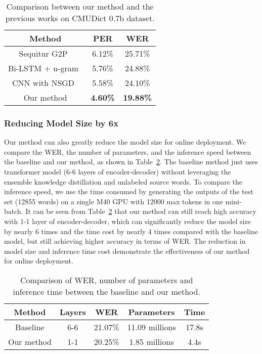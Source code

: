 \documentclass[a4paper]{article}
\begin{document}
\begin{table}[th]
  \caption{Comparison between our method and the previous works on CMUDict 0.7b dataset.}
  \label{tab:result1}
  \centering
  \begin{tabular}{ccc}
   \toprule
    \textbf{Method}                     & \textbf{PER} &\textbf{WER}          \\
    \midrule
     Sequitur G2P~\cite{bisani2008joint}                   &6.12\%&25.71\%           \\
     Bi-LSTM + n-gram~\cite{milde2017multitask}                     &5.76\%&24.88\%           \\
     CNN with NSGD~\cite{chae2018convolutional}                     &5.58\%&24.10\%          \\
\midrule
      Our method &\textbf{4.60\%}&\textbf{19.88\%}            \\
    \bottomrule
  \end{tabular}
  \end{table}
\vspace{-0.4cm}
\subsubsection{Reducing Model Size by 6x}
Our method can also greatly reduce the model size for online deployment. We compare the WER, the number of parameters, and the inference speed between the baseline and our method, as shown in Table~\ref{tab:result3}. The baseline method just uses transformer model (6-6 layers of encoder-decoder) without leveraging the ensemble knowledge distillation and unlabeled source words. To compare the inference speed, we use the time consumed by generating the outputs of the test set (12855 words) on a single M40 GPU with 12000 max tokens in one mini-batch. It can be seen from Table~\ref{tab:result3} that our method can still reach high accuracy with 1-1 layer of encoder-decoder, which can significantly reduce the model size by nearly 6 times and the time cost by nearly 4 times compared with the baseline model, but still achieving higher accuracy in terms of WER. The reduction in model size and inference time cost demonstrate the effectiveness of our method for online deployment.


\begin{table}[th]

  \caption{Comparison of WER, number of parameters and inference time between the baseline and our method.}
  \label{tab:result3}
  \centering
  \begin{tabular}{ccccc}
   \toprule
 \textbf{Method} & \textbf{Layers} & \textbf{WER} &\textbf{Parameters}   &\textbf{Time}          \\
    \midrule
Baseline &  6-6  &  21.07\%  &  11.09 millions  &  17.8s           \\
Our method &  1-1  &  20.25\%  &  1.85 millions  &  4.4s    \\ 
    \bottomrule
  \end{tabular}
\end{table}
\vspace{-0.4cm}
\end{document}
